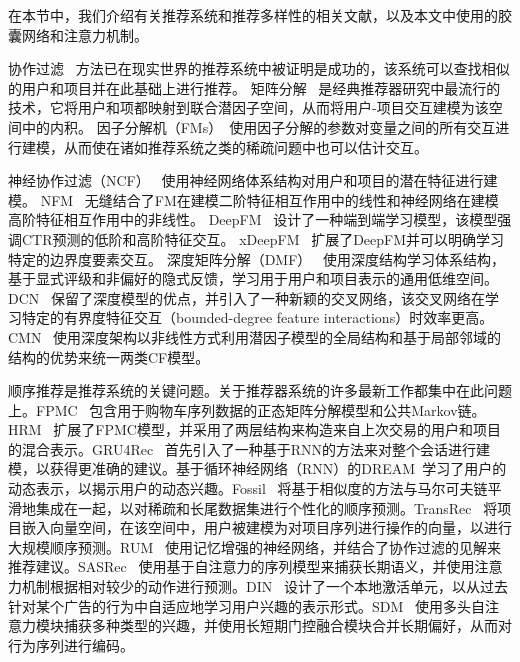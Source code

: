 
在本节中，我们介绍有关推荐系统和推荐多样性的相关文献，以及本文中使用的胶囊网络和注意力机制。

协作过滤~\cite{sarwar2001item,schafer2007collaborative} 方法已在现实世界的推荐系统中被证明是成功的，该系统可以查找相似的用户和项目并在此基础上进行推荐。 矩阵分解~\cite{koren2009matrix} 是经典推荐器研究中最流行的技术，它将用户和项都映射到联合潜因子空间，从而将用户-项目交互建模为该空间中的内积。 因子分解机（FMs）~\cite{rendle2010factorization}使用因子分解的参数对变量之间的所有交互进行建模，从而使在诸如推荐系统之类的稀疏问题中也可以估计交互。

神经协作过滤（NCF）~\cite{he2017neural} 使用神经网络体系结构对用户和项目的潜在特征进行建模。
NFM~\cite{he2017nfm} 无缝结合了FM在建模二阶特征相互作用中的线性和神经网络在建模高阶特征相互作用中的非线性。
DeepFM~\cite{guo2017deepfm} 设计了一种端到端学习模型，该模型强调CTR预测的低阶和高阶特征交互。
xDeepFM~\cite{lian2018xdeepfm} 扩展了DeepFM并可以明确学习特定的边界度要素交互。
深度矩阵分解（DMF）~\cite{xue2017deep} 使用深度结构学习体系结构，基于显式评级和非偏好的隐式反馈，学习用于用户和项目表示的通用低维空间。
DCN~\cite{wang2017deep} 保留了深度模型的优点，并引入了一种新颖的交叉网络，该交叉网络在学习特定的有界度特征交互（bounded-degree feature interactions）时效率更高。
CMN~\cite{ebesu2018collaborative} 使用深度架构以非线性方式利用潜因子模型的全局结构和基于局部邻域的结构的优势来统一两类CF模型。


顺序推荐是推荐系统的关键问题。关于推荐器系统的许多最新工作都集中在此问题上。FPMC~\cite{rendle2010factorizing} 包含用于购物车序列数据的正态矩阵分解模型和公共Markov链。HRM~\cite{wang2015learning} 扩展了FPMC模型，并采用了两层结构来构造来自上次交易的用户和项目的混合表示。GRU4Rec~\cite{hidasi2015session} 首先引入了一种基于RNN的方法来对整个会话进行建模，以获得更准确的建议。基于循环神经网络（RNN）的DREAM~\cite{yu2016dynamic}学习了用户的动态表示，以揭示用户的动态兴趣。Fossil~\cite{he2016fusing} 将基于相似度的方法与马尔可夫链平滑地集成在一起，以对稀疏和长尾数据集进行个性化的顺序预测。TransRec~\cite{he2017translation} 将项目嵌入向量空间，在该空间中，用户被建模为对项目序列进行操作的向量，以进行大规模顺序预测。RUM~\cite{chen2018sequential} 使用记忆增强的神经网络，并结合了协作过滤的见解来推荐建议。SASRec~\cite{kang2018self} 使用基于自注意力的序列模型来捕获长期语义，并使用注意力机制根据相对较少的动作进行预测。DIN~\cite{zhou2018deep} 设计了一个本地激活单元，以从过去针对某个广告的行为中自适应地学习用户兴趣的表示形式。SDM~\cite{lv2019sdm} 使用多头自注意力模块捕获多种类型的兴趣，并使用长短期门控融合模块合并长期偏好，从而对行为序列进行编码。

